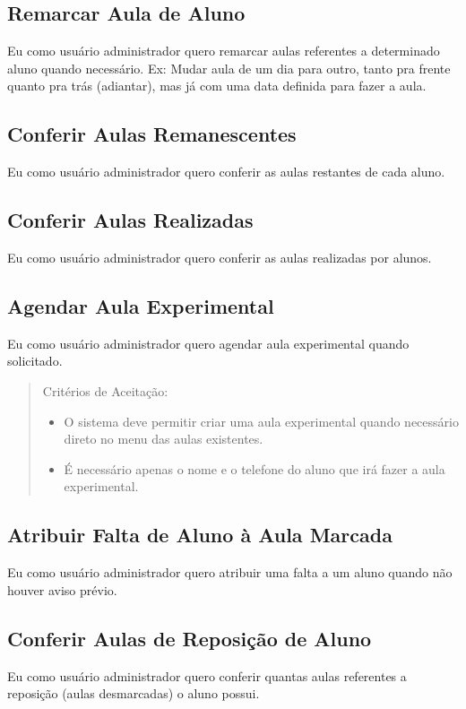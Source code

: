 \subsection[Remarcar Aula de Aluno]{Remarcar Aula de Aluno}
Eu como usuário administrador quero remarcar aulas referentes a determinado
aluno quando necessário.
Ex: Mudar aula de um dia para outro, tanto pra frente quanto pra trás
(adiantar), mas já com uma data definida para fazer a aula.

\subsection[Conferir Aulas Remanescentes]{Conferir Aulas Remanescentes}
Eu como usuário administrador quero conferir as aulas restantes de cada aluno.

\subsection[Conferir Aulas Realizadas]{Conferir Aulas Realizadas}
Eu como usuário administrador quero conferir as aulas realizadas por alunos.

\subsection[Agendar Aula Experimental]{Agendar Aula Experimental}
Eu como usuário administrador quero agendar aula experimental quando solicitado.

\begin{quote}
Critérios de Aceitação:
    \begin{itemize}
        \item O sistema deve permitir criar uma aula experimental quando necessário direto
        no menu das aulas existentes.
        \item É necessário apenas o nome e o telefone do aluno que irá fazer a aula
        experimental.
    \end{itemize}
\end{quote}

\subsection[Atribuir Falta de Aluno à Aula Marcada]{Atribuir Falta de Aluno à Aula Marcada}
Eu como usuário administrador quero atribuir uma falta a um aluno quando não
houver aviso prévio.

\subsection[Conferir Aulas de Reposição de Aluno]{Conferir Aulas de Reposição de Aluno}
Eu como usuário administrador quero conferir quantas aulas referentes a
reposição (aulas desmarcadas) o aluno possui.


